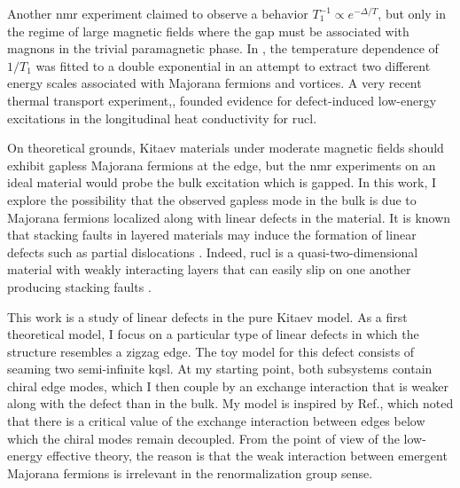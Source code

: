 Another \acrshort{nmr} experiment \cite{ Baek2017} claimed to observe a behavior $T_1^{-1} \propto e^{-\Delta/T}$, but only in the regime of large magnetic fields where the gap must be associated with magnons in the trivial paramagnetic phase. In \cite{Nagai_2020}, the temperature dependence of $1/T_1$ was fitted to a double exponential in an attempt to extract two different energy scales associated with Majorana fermions and vortices.
A very recent thermal transport experiment,\cite{Hentrich_2020}, founded evidence for defect-induced low-energy excitations in the longitudinal heat conductivity for \acrshort{rucl}.

On theoretical grounds, Kitaev materials under moderate magnetic fields should exhibit gapless Majorana fermions at the edge, but the \acrshort{nmr} experiments on an ideal material would probe the bulk excitation which is gapped. In this work, I explore the possibility that the observed gapless mode in the bulk is due to Majorana fermions localized along with linear defects in the material. %
It is known that stacking faults in layered materials may induce the formation of linear defects such as partial dislocations \cite{solyom-solids}.
Indeed, \acrshort{rucl} is a quasi-two-dimensional material with weakly interacting layers that can easily slip on one another producing stacking faults \cite{Kim_Kee_2016,Cao_2016,Ran2017,Zheng-SM2017}.

This work is a study of linear defects in the pure Kitaev model. As a first theoretical model, I focus on a particular type of linear defects in which the structure resembles a zigzag edge. The toy model for this defect consists of seaming two semi-infinite \acrshort{kqsl}. At my starting point, both subsystems contain chiral edge modes, which I then couple by an exchange interaction that is weaker along with the defect than in the bulk. My model is inspired by Ref.\cite{Aasen_2020}, which noted that there is a critical value of the exchange interaction between edges below which the chiral modes remain decoupled. From the point of view of the  low-energy  effective theory, the reason is that the weak interaction between emergent Majorana fermions is irrelevant in the renormalization group sense. %

